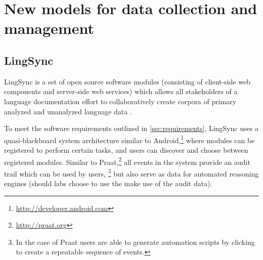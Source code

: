 \documentclass[11pt]{article}
\newcommand{\smalltodo}[2][]
    {\todo[caption={#2}, #1]
    {\tiny#2\normalsize}}
\begin{document}



\section{New models for data collection and management}



\subsection{LingSync}\label{sec:lingsync}

LingSync is a set of open source software modules (consisting of client-side web
components and server-side web services) which allows all stakeholders of a
language documentation effort to collaboratively create corpora of primary
analyzed and unanalyzed language data \cite{lingsync:2012}.

To meet the software requirements outlined in \autoref{sec:requirements},
LingSync uses a quasi-blackboard system architecture similar to
Android,\footnote{\url{http://developer.android.com}} where modules can be
registered to perform certain tasks, and users can discover and choose between
registered modules. Similar to Praat,\footnote{\url{http://praat.org}}%
all events in the system provide an audit trail which can be used by users,%
\footnote{In the case of Praat users are able to generate automation scripts by clicking to create a repeatable sequence of events.}
but also serve as data for automated reasoning
engines (should labs choose to use the make use of the audit data).
\end{document}
